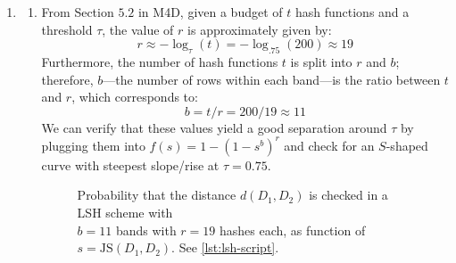 \documentclass{article}
\begin{document}
\begin{enumerate}[leftmargin={*}, font={\bf}, label={\arabic*.}, ref={\arabic*}]
  \item \label{qst:1}
    \begin{enumerate}[label={(\Alph*)}, ref={\theenumi(\Alph*)}]
      \item \label{qst:1A}
        From Section $5.2$ in M4D, given a budget of $t$ hash functions and a threshold
        $\tau$, the value of $r$ is approximately given by:
        \[
          r \approx -\log_{\tau}{(t)} = -\log_{.75}{(200)} \approx 19
        \]
        Furthermore, the number of hash functions $t$ is split into $r$ and $b$; therefore,
        $b$---the number of rows within each band---is the ratio between $t$ and $r$, which
        corresponds to:
        \[
          b = t/r = 200/19 \approx 11
        \]
        We can verify that these values yield a good separation around $\tau$ by plugging
        them into $f(s) = 1 - (1-s^b)^r$ and check for an $S$-shaped curve with steepest
        slope/rise at $\tau=0.75$.
        \begin{figure}[H]
          \centering
          \caption{
            Probability that the distance $d(D_1, D_2)$ is checked in a LSH scheme with \\
            $b=11$ bands with $r=19$ hashes each, as function of $s = \text{JS}(D_1, D_2)$.
            See \autoref{lst:lsh-script}.
          }
          \label{fig:lsh-curve}
        \end{figure}


\end{enumerate}
\end{enumerate}
\end{document}

